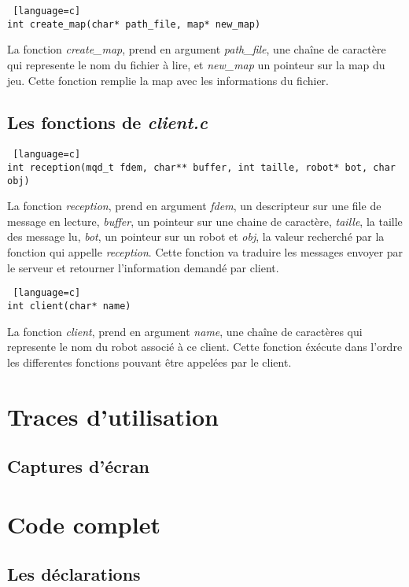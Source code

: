\documentclass[a4paper, 11pt]{article}
\begin{document}
\begin {lstlisting} [language=c]
int create_map(char* path_file, map* new_map)
\end{lstlisting}
La fonction \emph{create\_map}, prend en argument \emph{path\_file}, une chaîne de caractère qui represente le nom du fichier à lire, et \emph{new\_map} un pointeur sur la map du jeu. Cette fonction remplie la map avec les informations du fichier.\\

\subsection{Les fonctions de \emph{client.c}}
\begin {lstlisting} [language=c]
int reception(mqd_t fdem, char** buffer, int taille, robot* bot, char obj)
\end{lstlisting}
La fonction \emph{reception}, prend en argument \emph{fdem}, un descripteur sur une file de message en lecture, \emph{buffer}, un pointeur sur une chaine de caractère, \emph{taille}, la taille des message lu, \emph{bot}, un pointeur sur un robot et \emph{obj}, la valeur recherché par la fonction qui appelle \emph{reception}. Cette fonction va traduire les messages envoyer par le serveur et retourner l'information demandé par client.\\

\begin {lstlisting} [language=c]
int client(char* name)
\end{lstlisting}
La fonction \emph{client}, prend en argument \emph{name}, une chaîne de caractères qui represente le nom du robot associé à ce client. Cette fonction éxécute dans l'ordre les differentes fonctions pouvant être appelées par le client.\\


\newpage
\section{Traces d'utilisation}
\subsection{Captures d'écran}

\newpage
\section*{Code complet}
\subsection*{Les déclarations}

\end{document}
